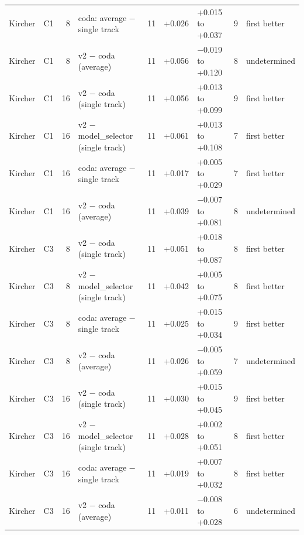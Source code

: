 {\begin{longtable}{llrlrrlrl}
Kircher & C1 & 8 & coda: average $-$ single track & 11 & +0.026 & +0.015 to +0.037 & 9 & first better \\
Kircher & C1 & 8 & v2 $-$ coda (average) & 11 & +0.056 & $-$0.019 to +0.120 & 8 & undetermined \\
Kircher & C1 & 16 & v2 $-$ coda (single track) & 11 & +0.056 & +0.013 to +0.099 & 9 & first better \\
Kircher & C1 & 16 & v2 $-$ model\_selector (single track) & 11 & +0.061 & +0.013 to +0.108 & 7 & first better \\
Kircher & C1 & 16 & coda: average $-$ single track & 11 & +0.017 & +0.005 to +0.029 & 7 & first better \\
Kircher & C1 & 16 & v2 $-$ coda (average) & 11 & +0.039 & $-$0.007 to +0.081 & 8 & undetermined \\
Kircher & C3 & 8 & v2 $-$ coda (single track) & 11 & +0.051 & +0.018 to +0.087 & 8 & first better \\
Kircher & C3 & 8 & v2 $-$ model\_selector (single track) & 11 & +0.042 & +0.005 to +0.075 & 8 & first better \\
Kircher & C3 & 8 & coda: average $-$ single track & 11 & +0.025 & +0.015 to +0.034 & 9 & first better \\
Kircher & C3 & 8 & v2 $-$ coda (average) & 11 & +0.026 & $-$0.005 to +0.059 & 7 & undetermined \\
Kircher & C3 & 16 & v2 $-$ coda (single track) & 11 & +0.030 & +0.015 to +0.045 & 9 & first better \\
Kircher & C3 & 16 & v2 $-$ model\_selector (single track) & 11 & +0.028 & +0.002 to +0.051 & 8 & first better \\
Kircher & C3 & 16 & coda: average $-$ single track & 11 & +0.019 & +0.007 to +0.032 & 8 & first better \\
Kircher & C3 & 16 & v2 $-$ coda (average) & 11 & +0.011 & $-$0.008 to +0.028 & 6 & undetermined \\
\bottomrule
\end{longtable}}

\renewcommand{\thetable}{S6a}

